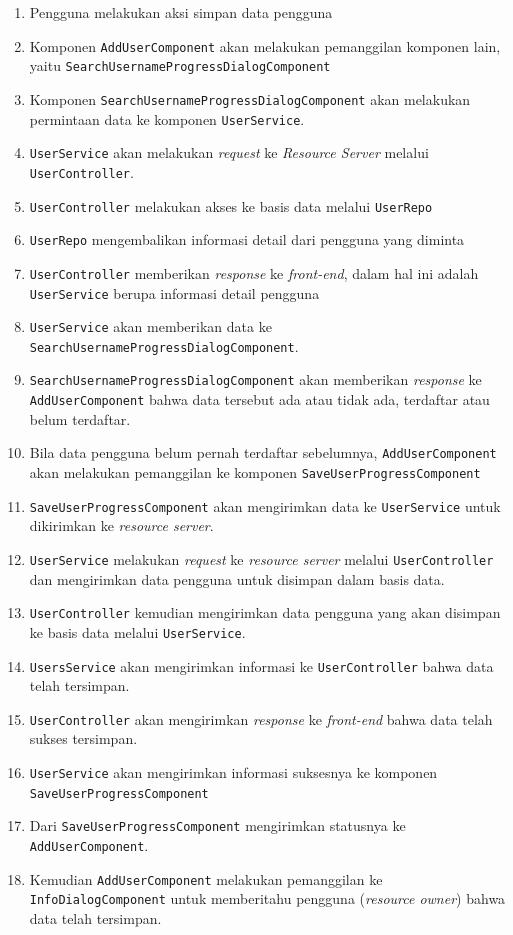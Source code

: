 \documentclass[pdftex,12pt, oneside]{article}
\begin{document}
\begin{itemize}
	\begin{enumerate}
		\item Pengguna melakukan aksi simpan data pengguna
		\item Komponen \texttt{AddUserComponent} akan melakukan pemanggilan komponen lain, yaitu \texttt{SearchUsernameProgressDialogComponent}
		\item Komponen \texttt{SearchUsernameProgressDialogComponent} akan melakukan permintaan data ke komponen \texttt{UserService}.
		\item \texttt{UserService} akan melakukan \textit{request} ke \textit{Resource Server} melalui \texttt{UserController}.
		\item \texttt{UserController} melakukan akses ke basis data melalui \texttt{UserRepo}
		\item \texttt{UserRepo} mengembalikan informasi detail dari pengguna yang diminta
		\item \texttt{UserController} memberikan \textit{response} ke \textit{front-end}, dalam hal ini adalah \texttt{UserService} berupa informasi detail pengguna
		\item \texttt{UserService} akan memberikan data ke \texttt{SearchUsernameProgressDialogComponent}.
		\item \texttt{SearchUsernameProgressDialogComponent} akan memberikan \textit{response} ke \texttt{AddUserComponent} bahwa data tersebut ada atau tidak ada, terdaftar atau belum terdaftar.
		\item Bila data pengguna belum pernah terdaftar sebelumnya, \texttt{AddUserComponent} akan melakukan pemanggilan ke komponen \texttt{SaveUserProgressComponent}
		\item \texttt{SaveUserProgressComponent} akan mengirimkan data ke \texttt{UserService} untuk dikirimkan ke \textit{resource server}.
		\item \texttt{UserService} melakukan \textit{request} ke \textit{resource server} melalui \texttt{UserController} dan mengirimkan data pengguna untuk disimpan dalam basis data.
		\item \texttt{UserController} kemudian mengirimkan data pengguna yang akan disimpan ke basis data melalui \texttt{UserService}.
		\item \texttt{UsersService} akan mengirimkan informasi ke \texttt{UserController} bahwa data telah tersimpan.
		\item \texttt{UserController} akan mengirimkan \textit{response} ke \textit{front-end} bahwa data telah sukses tersimpan.
		\item \texttt{UserService} akan mengirimkan informasi suksesnya ke komponen \texttt{SaveUserProgressComponent}
		\item Dari \texttt{SaveUserProgressComponent} mengirimkan statusnya ke \texttt{AddUserComponent}.
		\item Kemudian \texttt{AddUserComponent} melakukan pemanggilan ke \texttt{InfoDialogComponent} untuk memberitahu pengguna (\textit{resource owner}) bahwa data telah tersimpan.
	\end{enumerate}
	

\end{itemize}
\end{document}
